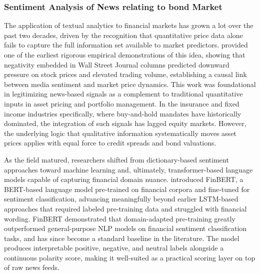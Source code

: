 \documentclass[12pt]{article}
\begin{document}
\subsubsection{Sentiment Analysis of News relating to bond Market}

The application of textual analytics to financial markets has grown a lot over the past two decades, driven by the recognition that quantitative price data alone fails to capture the full information set available to market predictors. \textcite{Tetlock2007GivingMarket} provided one of the earliest rigorous empirical demonstrations of this idea, showing that negativity embedded in Wall Street Journal columns predicted downward pressure on stock prices and elevated trading volume, establishing a causal link between media sentiment and market price dynamics. This work was foundational in legitimizing news-based signals as a complement to traditional quantitative inputs in asset pricing and portfolio management. In the insurance and fixed income industries specifically, where buy-and-hold mandates have historically dominated, the integration of such signals has lagged equity markets. However, the underlying logic that qualitative information systematically moves asset prices applies with equal force to credit spreads and bond valuations.

As the field matured, researchers shifted from dictionary-based sentiment approaches toward machine learning and, ultimately, transformer-based language models capable of capturing financial domain nuance. \textcite{Araci2019FinBERT:Models} introduced FinBERT, a BERT-based language model pre-trained on financial corpora and fine-tuned for sentiment classification, advancing meaningfully beyond earlier LSTM-based approaches that required labeled pre-training data and struggled with financial wording. FinBERT demonstrated that domain-adapted pre-training greatly outperformed general-purpose NLP models on financial sentiment classification tasks, and has since become a standard baseline in the literature. The model produces interpretable positive, negative, and neutral labels alongside a continuous polarity score, making it well-suited as a practical scoring layer on top of raw news feeds.
\end{document}
